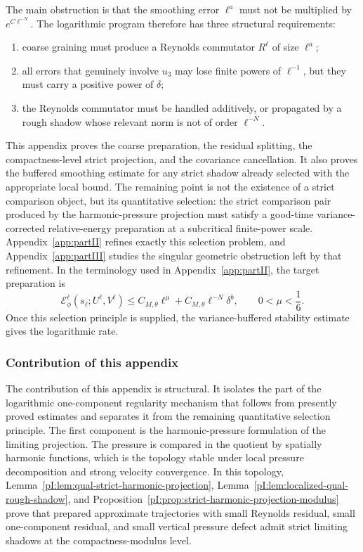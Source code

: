 \documentclass[11pt]{article}
\numberwithin{equation}{section}
\theoremstyle{plain}
\theoremstyle{definition}
\theoremstyle{remark}
\newcommand{\calE}{\mathcal E}
\begin{document}
The main obstruction is that the smoothing error \(\ell^a\) must not be multiplied by \(e^{C\ell^{-N}}\).  The logarithmic program therefore has three structural requirements:
\begin{enumerate}[label=(\roman*)]
\item coarse graining must produce a Reynolds commutator \(R^\ell\) of size \(\ell^a\);
\item all errors that genuinely involve \(u_3\) may lose finite powers of \(\ell^{-1}\), but they must carry a positive power of \(\delta\);
\item the Reynolds commutator must be handled additively, or propagated by a rough shadow whose relevant norm is not of order \(\ell^{-N}\).
\end{enumerate}
This appendix proves the coarse preparation, the residual splitting, the compactness-level strict projection, and the covariance cancellation.  It also proves the buffered smoothing estimate for any strict shadow already selected with the appropriate local bound.  The remaining point is not the existence of a strict comparison object, but its quantitative selection: the strict comparison pair produced by the harmonic-pressure projection must satisfy a good-time variance-corrected relative-energy preparation at a subcritical finite-power scale.  Appendix~\ref{app:partII} refines exactly this selection problem, and Appendix~\ref{app:partIII} studies the singular geometric obstruction left by that refinement.  In the terminology used in Appendix~\ref{app:partII}, the target preparation is
\[
        \calE_\phi^\ell(s_\ell;U^\ell,V^\ell)
        \le C_{M,\theta}\ell^\mu+C_{M,\theta}\ell^{-N}\delta^b,
        \qquad 0<\mu<\frac16 .
\]
Once this selection principle is supplied, the variance-buffered stability estimate gives the logarithmic rate.

\subsubsection{Contribution of this appendix}

The contribution of this appendix is structural.  It isolates the part of the logarithmic one-component regularity mechanism that follows from presently proved estimates and separates it from the remaining quantitative selection principle.  The first component is the harmonic-pressure formulation of the limiting projection.  The pressure is compared in the quotient by spatially harmonic functions, which is the topology stable under local pressure decomposition and strong velocity convergence.  In this topology, Lemma~\ref{pI:lem:qual-strict-harmonic-projection}, Lemma~\ref{pI:lem:localized-qual-rough-shadow}, and Proposition~\ref{pI:prop:strict-harmonic-projection-modulus} prove that prepared approximate trajectories with small Reynolds residual, small one-component residual, and small vertical pressure defect admit strict limiting shadows at the compactness-modulus level.
\end{document}
